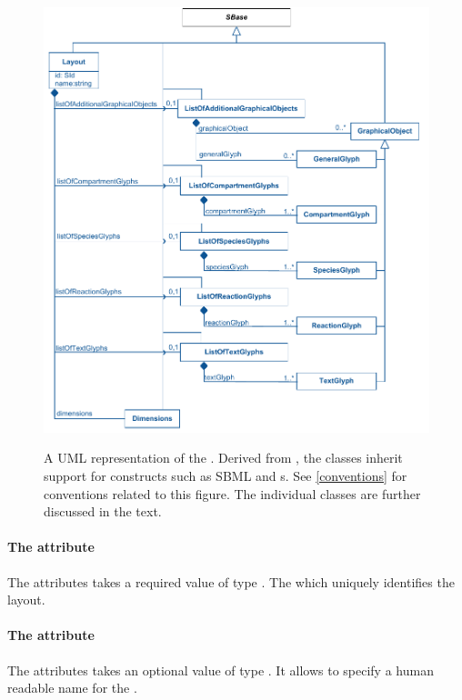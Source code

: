 \begin{figure}[!h]
\includegraphics{uml/layout-layout-uml}\\
\caption{A UML representation of the \LayoutPackage. Derived from 
\SBase, the \Layout classes inherit support for constructs such as SBML 
\Notes and {\Annotation}s. See \ref{conventions} for conventions related 
to this figure. The individual classes are further discussed in the 
text.} 
\label{figure:layout_uml}
\end{figure}

\paragraph{The  attribute}
The  attributes takes a required value of type . 
The  which uniquely identifies the layout. 


\paragraph{The  attribute}
The  attributes takes an optional value of type 
. It allows to specify a human readable name for the 
\LayoutClass. 


